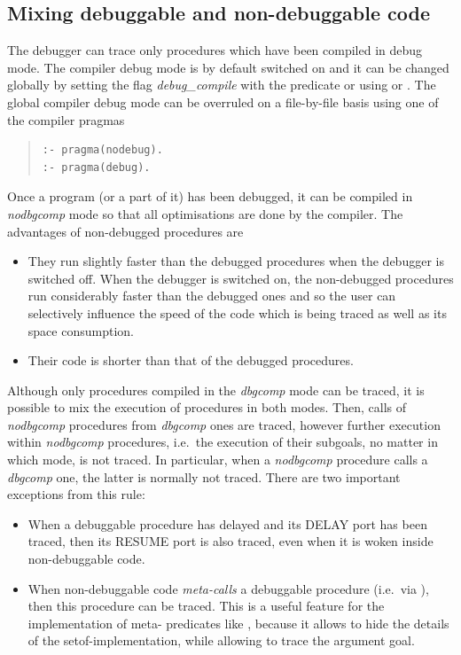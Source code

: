\subsection{Mixing debuggable and non-debuggable code}

The debugger can trace only procedures which have been compiled in
debug mode.  The compiler debug mode is by default switched on and it
can be changed globally by setting the flag {\it debug_compile} with the
predicate or using
 or
.
The global compiler debug mode can be overruled on a file-by-file basis
using one of the compiler pragmas
\begin{quote}\begin{verbatim}
:- pragma(nodebug).
:- pragma(debug).
\end{verbatim}\end{quote}
Once a program (or a part of it) has been
debugged, it can be compiled in {\it nodbgcomp} mode so that all
optimisations are done by the compiler.  The advantages of
non-debugged procedures are

\begin{itemize}
\item They run slightly faster than the debugged procedures
when the debugger is switched off.  When the debugger is switched on,
the non-debugged procedures run considerably faster than the debugged
ones and so the user can selectively influence the speed of the code
which is being traced as well as its space consumption.

\item Their code is shorter than that of the debugged procedures.
\end{itemize}

Although only procedures compiled in the {\it dbgcomp} mode can be
traced, it is possible to mix the execution of procedures in both
modes.  Then, calls of {\it nodbgcomp} procedures from {\it dbgcomp} ones are
traced, however further execution within {\it nodbgcomp} procedures,
i.e.\ the execution of their subgoals, no matter in which mode, is not
traced.  In particular, when a {\it nodbgcomp} procedure calls a {\it dbgcomp}
one, the latter is normally not traced.
There are two important exceptions from this rule:
\begin{itemize}
\item When a debuggable procedure has delayed and its DELAY port has
been traced, then its RESUME port is also traced, even when it is woken
inside non-debuggable code.
\item When non-debuggable code {\it meta-calls} a debuggable procedure
(i.e.\ via ),
then this procedure can be traced.  This is a useful feature for the
implementation of meta- predicates like
, because it
allows to hide the details of the setof-implementation, while allowing
to trace the argument goal.
\end{itemize}


